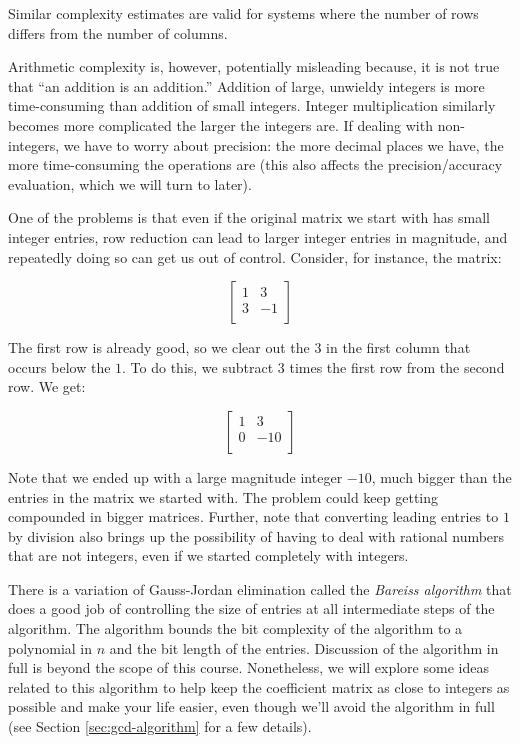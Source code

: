\documentclass[10pt]{amsart}
\begin{document}
Similar complexity estimates are valid for systems where the number of
rows differs from the number of columns.

Arithmetic complexity is, however, potentially misleading because, it
is not true that ``an addition is an addition.'' Addition of large,
unwieldy integers is more time-consuming than addition of small
integers. Integer multiplication similarly becomes more complicated
the larger the integers are. If dealing with non-integers, we have to
worry about precision: the more decimal places we have, the more
time-consuming the operations are (this also affects the
precision/accuracy evaluation, which we will turn to later).

One of the problems is that even if the original matrix we start with
has small integer entries, row reduction can lead to larger integer
entries in magnitude, and repeatedly doing so can get us out of
control. Consider, for instance, the matrix:

$$\left[ \begin{matrix} 1 & 3 \\ 3 & -1\\\end{matrix}\right]$$

The first row is already good, so we clear out the $3$ in the first
column that occurs below the $1$. To do this, we subtract $3$ times
the first row from the second row. We get:

$$\left[\begin{matrix} 1 & 3 \\ 0 & -10 \\\end{matrix} \right]$$

Note that we ended up with a large magnitude integer $-10$, much
bigger than the entries in the matrix we started with. The problem
could keep getting compounded in bigger matrices. Further, note that
converting leading entries to $1$ by division also brings up the
possibility of having to deal with rational numbers that are not
integers, even if we started completely with integers.

There is a variation of Gauss-Jordan elimination called the {\em
  Bareiss algorithm} that does a good job of controlling the size of
entries at all intermediate steps of the algorithm. The algorithm
bounds the bit complexity of the algorithm to a polynomial in $n$ and
the bit length of the entries. Discussion of the algorithm in full is
beyond the scope of this course. Nonetheless, we will explore some
ideas related to this algorithm to help keep the coefficient matrix as
close to integers as possible and make your life easier, even though
we'll avoid the algorithm in full (see Section \ref{sec:gcd-algorithm}
for a few details).
\end{document}
